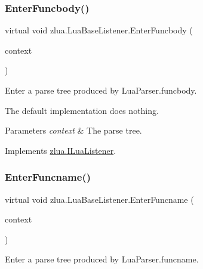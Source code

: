 \subsubsection{\texorpdfstring{Enter\+Funcbody()}{EnterFuncbody()}}
{\footnotesize\ttfamily virtual void zlua.\+Lua\+Base\+Listener.\+Enter\+Funcbody (\begin{DoxyParamCaption}\item[{\mbox{[}\+Not\+Null\mbox{]} \mbox{\hyperlink{classzlua_1_1_lua_parser_1_1_funcbody_context}{Lua\+Parser.\+Funcbody\+Context}}}]{context }\end{DoxyParamCaption})\hspace{0.3cm}{\ttfamily [virtual]}}



Enter a parse tree produced by Lua\+Parser.\+funcbody. 

The default implementation does nothing.


\begin{DoxyParams}{Parameters}
{\em context} & The parse tree.\\
\hline
\end{DoxyParams}


Implements \mbox{\hyperlink{interfacezlua_1_1_i_lua_listener_afb6c93f652b5230dbe2972642281f66b}{zlua.\+I\+Lua\+Listener}}.

\mbox{\label{classzlua_1_1_lua_base_listener_adae5a9d925d77bceb832b62f7ce47766}} 
\subsubsection{\texorpdfstring{Enter\+Funcname()}{EnterFuncname()}}
{\footnotesize\ttfamily virtual void zlua.\+Lua\+Base\+Listener.\+Enter\+Funcname (\begin{DoxyParamCaption}\item[{\mbox{[}\+Not\+Null\mbox{]} \mbox{\hyperlink{classzlua_1_1_lua_parser_1_1_funcname_context}{Lua\+Parser.\+Funcname\+Context}}}]{context }\end{DoxyParamCaption})\hspace{0.3cm}{\ttfamily [virtual]}}



Enter a parse tree produced by Lua\+Parser.\+funcname. 

